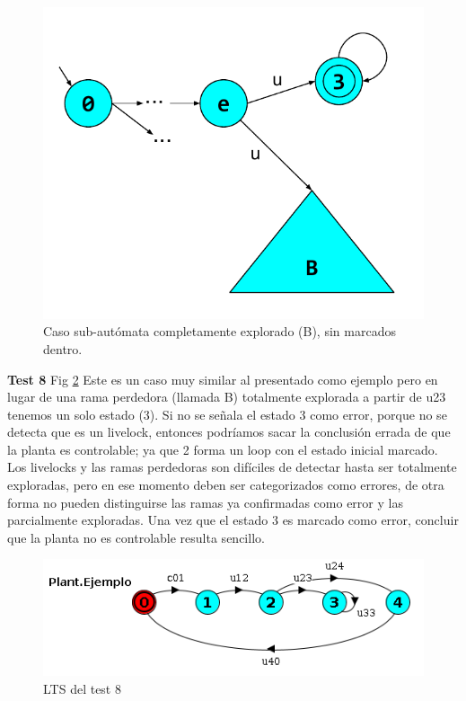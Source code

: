 \begin{figure}[htb]
	\centering
	\includegraphics[width=\linewidth/2]{figures/FalenciasErrores.pdf}
	\caption{Caso sub-autómata completamente explorado (B), sin marcados dentro.}
	\label{fig:falenciasErrores}
\end{figure}

\FloatBarrier
\textbf{Test 8} Fig \ref{fig:test8} 
Este es un caso muy similar al presentado como ejemplo pero en lugar de una rama perdedora (llamada B) totalmente explorada a partir de u23 tenemos un solo estado (3). Si no se señala el estado 3 como error, porque no se detecta que es un livelock, entonces podríamos sacar la conclusión errada de que la planta es controlable; ya que 2 forma un loop con el estado inicial marcado. Los livelocks y las ramas perdedoras son difíciles de detectar hasta ser totalmente exploradas, pero en ese momento deben ser categorizados como errores, de otra forma no pueden distinguirse las ramas ya confirmadas como error y las parcialmente exploradas. Una vez que el estado 3 es marcado como error, concluir que la planta no es controlable resulta sencillo.

\begin{figure}[h]
 \centering
 \includegraphics[scale=0.7]{figures/tests/test8.png}
 \caption{LTS del test 8}
 \label{fig:test8}
\end{figure}

